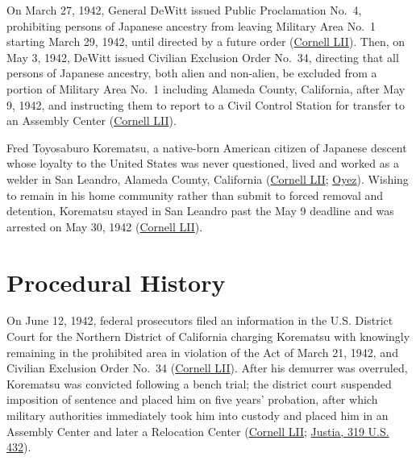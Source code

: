 \documentclass[12pt]{article}
\begin{document}
On March 27, 1942, General DeWitt issued Public Proclamation No.\ 4, prohibiting persons of Japanese ancestry from leaving Military Area No.\ 1 starting March 29, 1942, until directed by a future order (\href{https://www.law.cornell.edu/supremecourt/text/323/214}{Cornell LII}). Then, on May 3, 1942, DeWitt issued Civilian Exclusion Order No.\ 34, directing that all persons of Japanese ancestry, both alien and non-alien, be excluded from a portion of Military Area No.\ 1 including Alameda County, California, after May 9, 1942, and instructing them to report to a Civil Control Station for transfer to an Assembly Center (\href{https://www.law.cornell.edu/supremecourt/text/323/214}{Cornell LII}).

Fred Toyosaburo Korematsu, a native-born American citizen of Japanese descent whose loyalty to the United States was never questioned, lived and worked as a welder in San Leandro, Alameda County, California (\href{https://www.law.cornell.edu/supremecourt/text/323/214}{Cornell LII}; \href{https://www.oyez.org/cases/1940-1955/323us214}{Oyez}). Wishing to remain in his home community rather than submit to forced removal and detention, Korematsu stayed in San Leandro past the May 9 deadline and was arrested on May 30, 1942 (\href{https://www.law.cornell.edu/supremecourt/text/323/214}{Cornell LII}).

\section{Procedural History}
On June 12, 1942, federal prosecutors filed an information in the U.S. District Court for the Northern District of California charging Korematsu with knowingly remaining in the prohibited area in violation of the Act of March 21, 1942, and Civilian Exclusion Order No.\ 34 (\href{https://www.law.cornell.edu/supremecourt/text/323/214}{Cornell LII}). After his demurrer was overruled, Korematsu was convicted following a bench trial; the district court suspended imposition of sentence and placed him on five years' probation, after which military authorities immediately took him into custody and placed him in an Assembly Center and later a Relocation Center (\href{https://www.law.cornell.edu/supremecourt/text/323/214}{Cornell LII}; \href{https://supreme.justia.com/cases/federal/us/319/432/}{Justia, 319 U.S. 432}).
\end{document}
